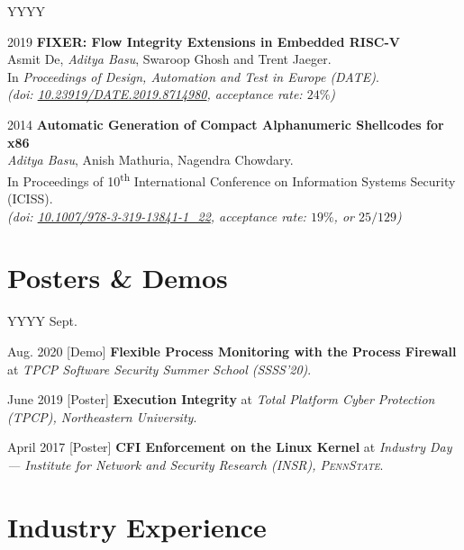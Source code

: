 \documentclass[margin]{res}
\newcommand{\psu}{\textsc{PennState}}
\newcommand{\doi}[1]{\href{http://dx.doi.org/#1}{#1}}
\begin{document}
\begin{resume}
\begin{labeling}{YYYY}
\item[2019]
    \textbf{FIXER: Flow Integrity Extensions in Embedded RISC-V}\\
    Asmit De, \emph{Aditya Basu}, Swaroop Ghosh and Trent Jaeger.\\
    In \emph{Proceedings of Design, Automation and Test in Europe (DATE)}.\\
    {\itshape (doi: \doi{10.23919/DATE.2019.8714980}, acceptance rate: $24\%$)}

\item[2014]
    \textbf{Automatic Generation of Compact Alphanumeric Shellcodes for x86}\\
    \emph{Aditya Basu}, Anish Mathuria, Nagendra Chowdary.\\
    In Proceedings of 10\textsuperscript{th} International Conference on Information Systems Security (ICISS).\\
    {\itshape (doi: \doi{10.1007/978-3-319-13841-1\_22}, acceptance rate: $19\%$, or $25/129$)}
\end{labeling}

\section{Posters \& Demos}

\begin{labeling}{YYYY Sept.}

\item[Aug. 2020] [Demo] \textbf{Flexible Process Monitoring with the Process Firewall} at \emph{TPCP Software Security Summer School (SSSS’20)}.

\item[June 2019] [Poster] \textbf{Execution Integrity} at \emph{Total Platform Cyber Protection (TPCP), Northeastern University}.

\item[April 2017] [Poster] \textbf{CFI Enforcement on the Linux Kernel} at \emph{Industry Day --- Institute for Network and Security Research (INSR), \psu}.

\end{labeling}

\section{Industry Experience}


\end{resume}
\end{document}
